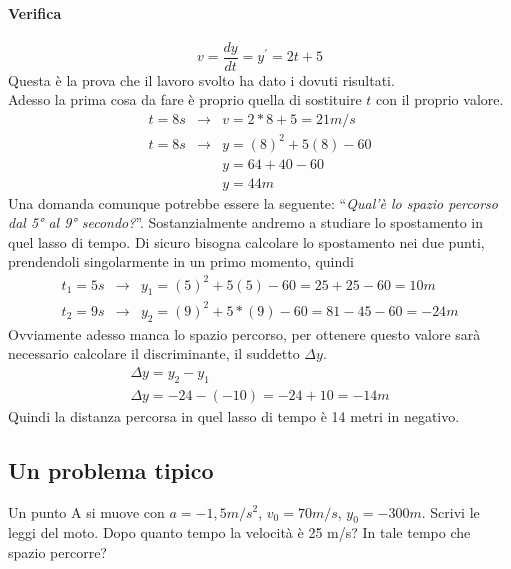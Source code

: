 \documentclass{book}
\begin{document}
\paragraph{Verifica} \[v=\frac{dy}{dt}=y^\prime=2t+5\] Questa è la prova che il
lavoro svolto ha dato i dovuti risultati.\\
Adesso la prima cosa da fare è proprio quella di sostituire $t$ con il proprio
valore.
\begin{equation}
	\begin{matrix}
			t=8s&\to&v=2*8+5=21m/s\\
			t=8s&\to&y=(8)^2+5(8)-60\\
			&&y=64+40-60\\
			&&y=44m
	\end{matrix}
\end{equation}
Una domanda comunque potrebbe essere la seguente: ``\textit{Qual'è lo spazio
percorso dal 5° al 9° secondo?}''. Sostanzialmente andremo a studiare lo
spostamento in quel lasso di tempo. Di sicuro bisogna calcolare lo spostamento
nei due punti, prendendoli singolarmente in un primo momento, quindi
\begin{equation}
	\begin{matrix}
		t_1=5s&\to&y_1=(5)^2+5(5)-60=25+25-60=10m\\
		t_2=9s&\to&y_2=(9)^2+5*(9)-60=81-45-60=-24m
	\end{matrix}
\end{equation}
Ovviamente adesso manca lo spazio percorso, per ottenere questo valore sarà
necessario calcolare il discriminante, il suddetto $\Delta y$.
\begin{equation}
	\boxed{
		\begin{matrix}
			\Delta y=y_2-y_1\\
			\Delta y=-24-(-10)=-24+10=-14m
		\end{matrix}
	}
\end{equation}
Quindi la distanza percorsa in quel lasso di tempo è 14 metri in negativo.
\subsection{Un problema tipico}
Un punto A si muove con $a=-1,5m/s^2$, $v_0=70m/s$, $y_0=-300m$. Scrivi le leggi
del moto. Dopo quanto tempo la velocità è 25 m/s? In tale tempo che spazio
percorre?
\end{document}
